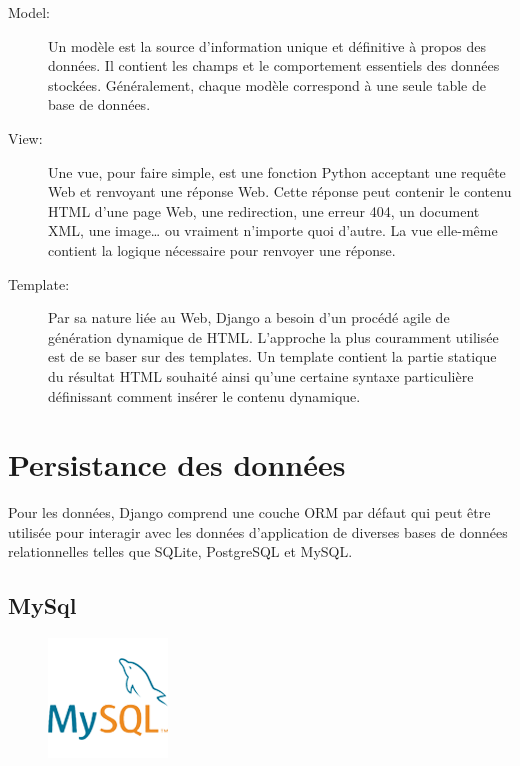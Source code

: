 \begin{description}
    \item[Model:] Un modèle est la source d’information unique et définitive à
        propos des données. Il contient les champs et le comportement essentiels
        des données stockées. Généralement, chaque modèle correspond à une seule
        table de base de données\cite{19}.
    \item[View:] Une vue, pour faire simple, est une fonction Python acceptant
        une requête Web et renvoyant une réponse Web. Cette réponse peut
        contenir le contenu HTML d’une page Web, une redirection, une erreur
        404, un document XML, une image… ou vraiment n’importe quoi d’autre. La
        vue elle-même contient la logique nécessaire pour renvoyer une
        réponse\cite{20}.
    \item[Template:] Par sa nature liée au Web, Django a besoin d’un procédé
        agile de génération dynamique de HTML. L’approche la plus couramment
        utilisée est de se baser sur des templates. Un template contient la
        partie statique du résultat HTML souhaité ainsi qu’une certaine syntaxe
        particulière définissant comment insérer le contenu dynamique\cite{21}.
\end{description}

\section{Persistance des données}
Pour les données, Django comprend une couche ORM par défaut qui peut être 
utilisée pour interagir avec les données d'application de diverses bases de 
données relationnelles telles que SQLite, PostgreSQL et MySQL.

\subsection{MySql}
\begin{figure}
    \vspace{-22pt}
    \begin{center}
        \includegraphics[scale=0.36]{images/logo/mysql.png}
        \label{fig76}
    \end{center}
    \vspace{-20pt}
    \vspace{-10pt}
\end{figure}

